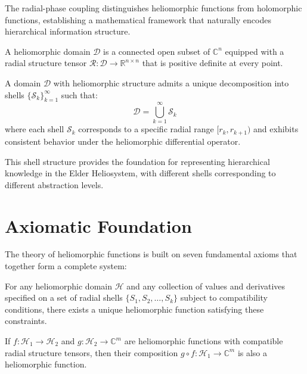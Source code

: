 The radial-phase coupling distinguishes heliomorphic functions from holomorphic functions, establishing a mathematical framework that naturally encodes hierarchical information structure.

\begin{definition}
A heliomorphic domain $\mathcal{D}$ is a connected open subset of $\mathbb{C}^n$ equipped with a radial structure tensor $\mathcal{R}: \mathcal{D} \rightarrow \mathbb{R}^{n \times n}$ that is positive definite at every point.
\end{definition}

\begin{theorem}
A domain $\mathcal{D}$ with heliomorphic structure admits a unique decomposition into shells $\{\mathcal{S}_k\}_{k=1}^{\infty}$ such that:
\begin{equation}
\mathcal{D} = \bigcup_{k=1}^{\infty} \mathcal{S}_k
\end{equation}
where each shell $\mathcal{S}_k$ corresponds to a specific radial range $[r_k, r_{k+1})$ and exhibits consistent behavior under the heliomorphic differential operator.
\end{theorem}

This shell structure provides the foundation for representing hierarchical knowledge in the Elder Heliosystem, with different shells corresponding to different abstraction levels.

\section{Axiomatic Foundation}

The theory of heliomorphic functions is built on seven fundamental axioms that together form a complete system:

\begin{axiom}
For any heliomorphic domain $\mathcal{H}$ and any collection of values and derivatives specified on a set of radial shells $\{S_1, S_2, \ldots, S_k\}$ subject to compatibility conditions, there exists a unique heliomorphic function satisfying these constraints.
\end{axiom}

\begin{axiom}
If $f: \mathcal{H}_1 \rightarrow \mathcal{H}_2$ and $g: \mathcal{H}_2 \rightarrow \mathbb{C}^m$ are heliomorphic functions with compatible radial structure tensors, then their composition $g \circ f: \mathcal{H}_1 \rightarrow \mathbb{C}^m$ is also a heliomorphic function.
\end{axiom}


